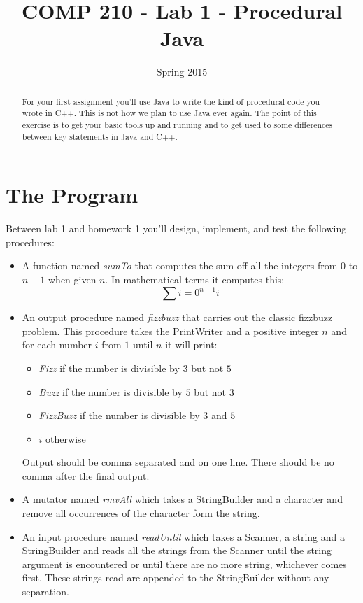 \documentclass[]{tufte-handout}
\title{COMP 210 - Lab 1 - Procedural Java}
\date{Spring 2015}
\begin{document}
\maketitle

\begin{abstract}
For your first assignment you'll use Java to write the kind of procedural code you wrote in C++. This is not how we plan to use Java ever again. The point of this exercise is to get your basic tools up and running and to get used to some differences between key statements in Java and C++.
\end{abstract}

\section{The Program}

Between lab 1 and homework 1 you'll design, implement, and test the following procedures:
\begin{itemize}
\item A function named \textit{sumTo} that computes the sum off all the integers from $0$ to $n-1$ when given $n$. In mathematical terms it computes this:
\[
\sum\limits{i=0}^{n-1} i 
\] 

\item An output procedure named \textit{fizzbuzz} that carries out the classic fizzbuzz problem. This procedure takes the PrintWriter and a positive integer $n$ and for each number $i$ from $1$ until $n$ it will print:
\begin{itemize}
\item \textit{Fizz} if the number is divisible by $3$ but not $5$
\item \textit{Buzz} if the number is divisible by $5$ but not $3$
\item \textit{FizzBuzz} if the number is divisible by $3$ and $5$
\item $i$ otherwise
\end{itemize}
Output should be comma separated and on one line. There should be no comma after the final output. 

\item A mutator named \textit{rmvAll} which takes a StringBuilder and a character and remove all occurrences of the character form the string. 

\item An input procedure named \textit{readUntil} which takes a Scanner, a string and a StringBuilder and reads all the strings from the Scanner until the string argument is encountered or until there are no more string, whichever comes first. These strings read are appended to the StringBuilder without any separation. 
\end{itemize}
\end{document}
